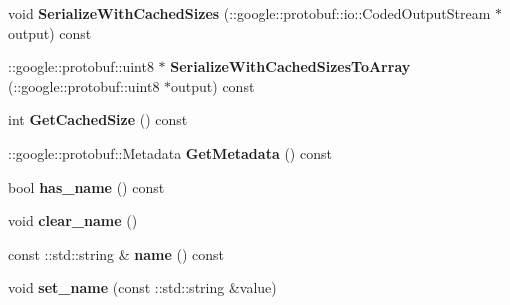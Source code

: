 \begin{DoxyCompactItemize}
\item 
\hypertarget{classedcdatatypes_1_1_edc_payload___edc_metric_a21fcc205490af2e9a2cd353a01135f93}{void {\bfseries Serialize\-With\-Cached\-Sizes} (\-::google\-::protobuf\-::io\-::\-Coded\-Output\-Stream $\ast$output) const }\label{classedcdatatypes_1_1_edc_payload___edc_metric_a21fcc205490af2e9a2cd353a01135f93}

\item 
\hypertarget{classedcdatatypes_1_1_edc_payload___edc_metric_abbda6e25c9bd7c8166259837c0610d8d}{\-::google\-::protobuf\-::uint8 $\ast$ {\bfseries Serialize\-With\-Cached\-Sizes\-To\-Array} (\-::google\-::protobuf\-::uint8 $\ast$output) const }\label{classedcdatatypes_1_1_edc_payload___edc_metric_abbda6e25c9bd7c8166259837c0610d8d}

\item 
\hypertarget{classedcdatatypes_1_1_edc_payload___edc_metric_a77053f12d824c8ba6ffd5a6e24d4e99c}{int {\bfseries Get\-Cached\-Size} () const }\label{classedcdatatypes_1_1_edc_payload___edc_metric_a77053f12d824c8ba6ffd5a6e24d4e99c}

\item 
\hypertarget{classedcdatatypes_1_1_edc_payload___edc_metric_a284e01929a207c46a0ce08ee10e69067}{\-::google\-::protobuf\-::\-Metadata {\bfseries Get\-Metadata} () const }\label{classedcdatatypes_1_1_edc_payload___edc_metric_a284e01929a207c46a0ce08ee10e69067}

\item 
\hypertarget{classedcdatatypes_1_1_edc_payload___edc_metric_acd8f89f5e527d93ca8ed71a80206de79}{bool {\bfseries has\-\_\-name} () const }\label{classedcdatatypes_1_1_edc_payload___edc_metric_acd8f89f5e527d93ca8ed71a80206de79}

\item 
\hypertarget{classedcdatatypes_1_1_edc_payload___edc_metric_aba1fc6cd7f8760310821c1d512062f97}{void {\bfseries clear\-\_\-name} ()}\label{classedcdatatypes_1_1_edc_payload___edc_metric_aba1fc6cd7f8760310821c1d512062f97}

\item 
\hypertarget{classedcdatatypes_1_1_edc_payload___edc_metric_a27028332992ea45cca92e0112ea69c76}{const \-::std\-::string \& {\bfseries name} () const }\label{classedcdatatypes_1_1_edc_payload___edc_metric_a27028332992ea45cca92e0112ea69c76}

\item 
\hypertarget{classedcdatatypes_1_1_edc_payload___edc_metric_af8f25a33decf99e9e177dd029eb72010}{void {\bfseries set\-\_\-name} (const \-::std\-::string \&value)}\label{classedcdatatypes_1_1_edc_payload___edc_metric_af8f25a33decf99e9e177dd029eb72010}


\end{DoxyCompactItemize}
